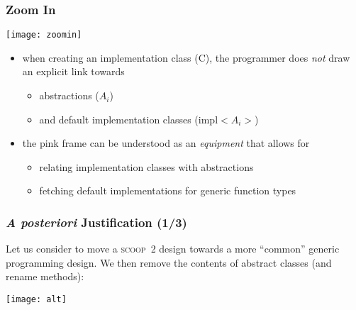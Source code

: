 \documentclass{beamer}
\newcommand{\scoop}{\textsc{scoop}\xspace}
\begin{document}
\begin{frame}
  \frametitle{Zoom In}
\begin{multicols}{2}
%
\texttt{[image: zoomin]}
%
\columnbreak
%
\begin{itemize}
  \scriptsize
\item when creating an implementation class (C), the programmer does
  \textit{not} draw an explicit link towards
  \begin{itemize} \scriptsize
    \item abstractions ($A_i$)
    \item and default implementation classes (impl$< \!\! A_i \!\! >$)
  \end{itemize}
  \smallskip
\item the pink frame can be understood as an \textit{equipment} that allows for
  \begin{itemize} \scriptsize
  \item relating implementation classes with abstractions
  \item fetching default implementations for generic function types
  \end{itemize}
\end{itemize}
%
\end{multicols}

\end{frame}




\begin{frame}
  \frametitle{\textit{A posteriori} Justification (1/3)}

  {\scriptsize{ Let us consider to move a \scoop~2 design towards a
    more ``common'' generic programming design.  We then remove the
    contents of abstract classes (and rename methods):
  }}

  \begin{center}
    \texttt{[image: alt]}
  \end{center}

\end{frame}
\end{document}
